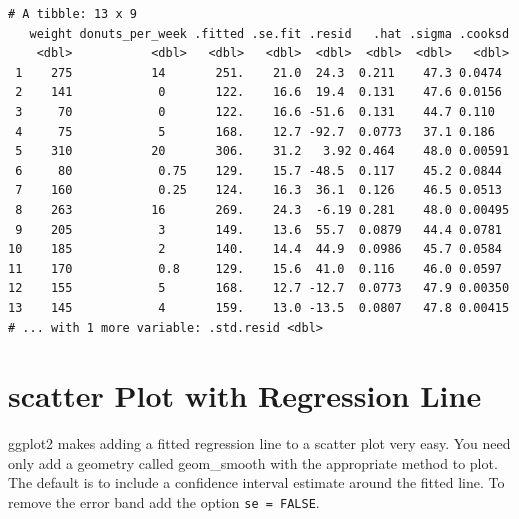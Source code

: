 \documentclass[]{book}
\newenvironment{Shaded}{\begin{snugshade}}{\end{snugshade}}
\newcommand{\DataTypeTok}[1]{\textcolor[rgb]{0.13,0.29,0.53}{#1}}
\newcommand{\KeywordTok}[1]{\textcolor[rgb]{0.13,0.29,0.53}{\textbf{#1}}}
\newcommand{\NormalTok}[1]{#1}
\newcommand{\OperatorTok}[1]{\textcolor[rgb]{0.81,0.36,0.00}{\textbf{#1}}}
\newcommand{\StringTok}[1]{\textcolor[rgb]{0.31,0.60,0.02}{#1}}
\begin{document}
\begin{Shaded}
\end{Shaded}

\begin{verbatim}
# A tibble: 13 x 9
   weight donuts_per_week .fitted .se.fit .resid   .hat .sigma .cooksd
    <dbl>           <dbl>   <dbl>   <dbl>  <dbl>  <dbl>  <dbl>   <dbl>
 1    275           14       251.    21.0  24.3  0.211    47.3 0.0474 
 2    141            0       122.    16.6  19.4  0.131    47.6 0.0156 
 3     70            0       122.    16.6 -51.6  0.131    44.7 0.110  
 4     75            5       168.    12.7 -92.7  0.0773   37.1 0.186  
 5    310           20       306.    31.2   3.92 0.464    48.0 0.00591
 6     80            0.75    129.    15.7 -48.5  0.117    45.2 0.0844 
 7    160            0.25    124.    16.3  36.1  0.126    46.5 0.0513 
 8    263           16       269.    24.3  -6.19 0.281    48.0 0.00495
 9    205            3       149.    13.6  55.7  0.0879   44.4 0.0781 
10    185            2       140.    14.4  44.9  0.0986   45.7 0.0584 
11    170            0.8     129.    15.6  41.0  0.116    46.0 0.0597 
12    155            5       168.    12.7 -12.7  0.0773   47.9 0.00350
13    145            4       159.    13.0 -13.5  0.0807   47.8 0.00415
# ... with 1 more variable: .std.resid <dbl>
\end{verbatim}

\hypertarget{scatter-plot-with-regression-line}{%
\section{scatter Plot with Regression Line}\label{scatter-plot-with-regression-line}}

ggplot2 makes adding a fitted regression line to a scatter plot very easy. You need only add a geometry called geom\_smooth with the appropriate method to plot. The default is to include a confidence interval estimate around the fitted line. To remove the error band add the option \texttt{se\ =\ FALSE}.

\begin{Shaded}
\end{Shaded}
\end{document}
